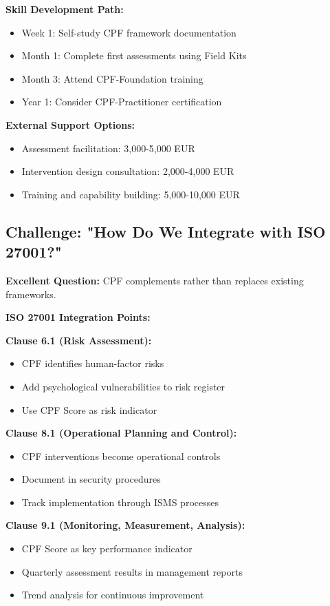 \documentclass[11pt,a4paper]{article}
\begin{document}
\textbf{Skill Development Path:}
\begin{itemize}
\item Week 1: Self-study CPF framework documentation
\item Month 1: Complete first assessments using Field Kits
\item Month 3: Attend CPF-Foundation training
\item Year 1: Consider CPF-Practitioner certification
\end{itemize}

\textbf{External Support Options:}
\begin{itemize}
\item Assessment facilitation: 3,000-5,000 EUR
\item Intervention design consultation: 2,000-4,000 EUR
\item Training and capability building: 5,000-10,000 EUR
\end{itemize}

\subsection{Challenge: "How Do We Integrate with ISO 27001?"}

\textbf{Excellent Question:} CPF complements rather than replaces existing frameworks.

\textbf{ISO 27001 Integration Points:}

\textbf{Clause 6.1 (Risk Assessment):}
\begin{itemize}
\item CPF identifies human-factor risks
\item Add psychological vulnerabilities to risk register
\item Use CPF Score as risk indicator
\end{itemize}

\textbf{Clause 8.1 (Operational Planning and Control):}
\begin{itemize}
\item CPF interventions become operational controls
\item Document in security procedures
\item Track implementation through ISMS processes
\end{itemize}

\textbf{Clause 9.1 (Monitoring, Measurement, Analysis):}
\begin{itemize}
\item CPF Score as key performance indicator
\item Quarterly assessment results in management reports
\item Trend analysis for continuous improvement
\end{itemize}
\end{document}
